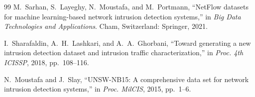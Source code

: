 \documentclass[11pt,a4paper]{article}
\begin{document}
\begin{thebibliography}{99}
 M.~Sarhan, S.~Layeghy, N.~Moustafa, and M.~Portmann, ``NetFlow
datasets for machine learning-based network intrusion detection systems,'' in
\emph{Big Data Technologies and Applications}. Cham, Switzerland: Springer, 2021.

 I.~Sharafaldin, A.~H.~Lashkari, and A.~A.~Ghorbani, ``Toward
generating a new intrusion detection dataset and intrusion traffic
characterization,'' in \emph{Proc. 4th ICISSP}, 2018, pp.~108--116.

 N.~Moustafa and J.~Slay, ``UNSW-NB15: A comprehensive data set for
network intrusion detection systems,'' in \emph{Proc. MilCIS}, 2015, pp.~1--6.

\end{thebibliography}
\end{document}
